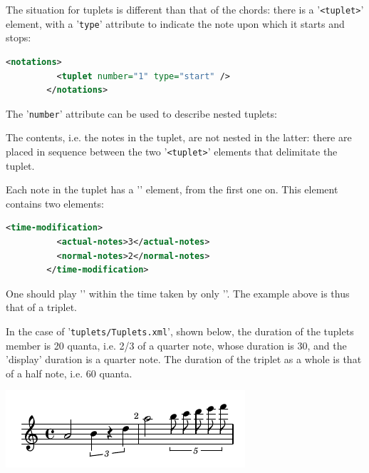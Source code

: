 \documentclass[12pt,a4paper]{article}
\begin{document}
The situation for tuplets is different than that of the chords: there is a {'\tt <tuplet>}' element, with a {'\tt type}' attribute to indicate the note upon which it starts and stops:

\begin{lstlisting}[language=XML]
        <notations>
          <tuplet number="1" type="start" />
        </notations>
\end{lstlisting}

The {'\tt number}' attribute can be used to describe nested tuplets:

The contents, i.e. the notes in the tuplet, are not nested in the latter: there are placed in sequence between the two {'\tt <tuplet>}' elements that delimitate the tuplet. 

Each note in the tuplet has a {'\tt <time-modification>}' element, from the first one on. This element contains two elements:
\begin{lstlisting}[language=XML]
        <time-modification>
          <actual-notes>3</actual-notes>
          <normal-notes>2</normal-notes>
        </time-modification>
\end{lstlisting}

One should play {'\tt <actual-notes>}' within the time taken by only {'\tt <normal-notes>}'. The example above is thus that of a triplet.

In the case of {'\tt tuplets/Tuplets.xml}', shown below, the duration of the tuplets member is 20 quanta, i.e. 2/3 of a quarter note, whose duration is 30, and the 'display' duration is a quarter note. The duration of the triplet as a whole is that of a half note, i.e. 60 quanta.

\includegraphics{Tuplet.png}
\end{document}
